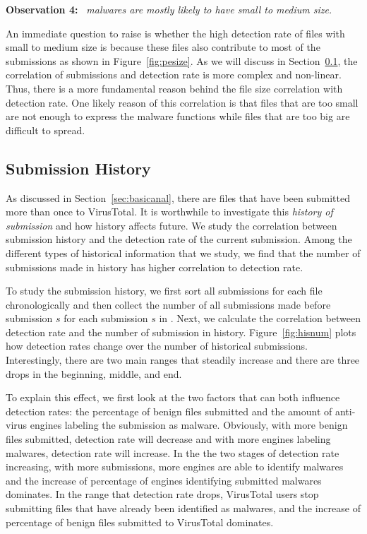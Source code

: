 {\bf Observation 4:} 
{\em \pe\ malwares are mostly likely to have small to medium size.}

An immediate question to raise is whether the high detection rate of files with small to medium size
is because these files also contribute to most of the submissions as shown in Figure~\ref{fig:pesize}.
As we will discuss in Section~\ref{sec:history}, the correlation of submissions and detection rate is more complex and non-linear.
Thus, there is a more fundamental reason behind the file size correlation with detection rate.
One likely reason of this correlation is that files that are too small are not enough to express the
malware functions while files that are too big are difficult to spread.

\subsection{Submission History}
\label{sec:history}




As discussed in Section~\ref{sec:basicanal}, there are files that have been submitted more than once to VirusTotal. 
It is worthwhile to investigate this {\em history of submission} and how history affects future.
We study the correlation between submission history and the detection rate of the current submission.
Among the different types of historical information that we study,
we find that the number of submissions made in history has higher correlation to detection rate.

To study the submission history, we first sort all submissions for each file chronologically
and then collect the number of all submissions made before submission $s$ for each submission $s$ in \vt.
Next, we calculate the correlation between detection rate and the number of submission in history.
Figure~\ref{fig:hisnum} plots how detection rates change over the number of historical submissions.
Interestingly, there are two main ranges that steadily increase and there are three drops in the beginning, middle, and end.

To explain this effect, we first look at the two factors that can both influence detection rates:
the percentage of benign files submitted and the amount of anti-virus engines labeling the submission as malware.
Obviously, with more benign files submitted, detection rate will decrease
and with more engines labeling malwares, detection rate will increase. 
In the the two stages of detection rate increasing, 
with more submissions, more engines are able to identify malwares 
and the increase of percentage of engines identifying submitted malwares dominates. 
In the range that detection rate drops, 
VirusTotal users stop submitting files that have already been identified as malwares,
and the increase of percentage of benign files submitted to VirusTotal dominates. 



